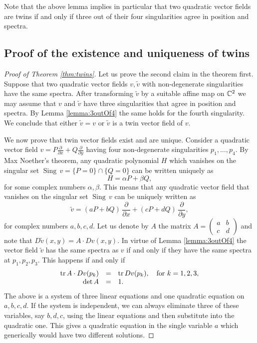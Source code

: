 \documentclass[phd,tocprelim]{cornell}
\begin{document}
Note that the above lemma implies in particular that two quadratic vector fields are twins if and only if three out of their four singularities agree in position and spectra.


\subsection{Proof of the existence and uniqueness of twins}\label{subsec:twins}

\begin{proof}[Proof of Theorem \ref*{thm:twins}]
Let us prove the second claim in the theorem first. Suppose that two quadratic vector fields $v,\tilde{v}$ with non-degenerate singularities have the same spectra. After transforming $\tilde{v}$ by a suitable affine map on $\mathbb{C}^2$ we may assume that $v$ and $\tilde{v}$ have three singularities that agree in position and spectra. By Lemma \ref{lemma:3outOf4} the same holds for the fourth singularity. We conclude that either $\tilde{v}=v$ or $\tilde{v}$ is a twin vector field of $v$.

We now prove that twin vector fields exist and are unique. Consider a quadratic vector field $v=P\frac{\partial}{\partial x}+Q\frac{\partial}{\partial y}$ having four non-degenerate singularities $p_1,\ldots,p_4$. By Max Noether's theorem, any quadratic polynomial $H$ which vanishes on the singular set $\operatorname{Sing}\,v=\{P=0\}\cap\{Q=0\}$ can be written uniquely as
\[ H=\alpha P+\beta Q, \]
for some complex numbers $\alpha,\beta$. This means that any quadratic vector field that vanishes on the singular set $\operatorname{Sing}\,v$ can be uniquely written as
\[ \tilde{v}=(aP+bQ)\,\frac{\partial}{\partial x}+(cP+dQ)\,\frac{\partial}{\partial y}, \]
for complex numbers $a,b,c,d$. Let us denote by $A$ the matrix $A=\left(\begin{smallmatrix}a&b\\c&d\end{smallmatrix}\right)$ and note that $D\tilde{v}(x,y)=A\cdot Dv(x,y)$. In virtue of Lemma \ref{lemma:3outOf4} the vector field $\tilde{v}$ has the same spectra as $v$ if and only if they have the same spectra at $p_1,p_2,p_3$. This happens if and only if
\begin{equation}\label{eq:system} \begin{array}{rcl}
\operatorname{tr}{A\cdot Dv(p_k)}&=&\operatorname{tr}{Dv(p_k)},\quad \mbox{for } k=1,2,3, \\
\det{A} &=& 1. \\
\end{array} \end{equation}
The above is a system of three linear equations and one quadratic equation on $a,b,c,d$. If the system is independent, we can always eliminate three of these variables, say $b,d,c$, using the linear equations and then substitute into the quadratic one. This gives a quadratic equation in the single variable $a$ which generically would have two different solutions. 


\end{proof}
\end{document}
